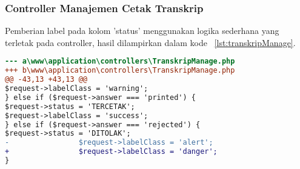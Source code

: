 \subsubsection{Controller Manajemen Cetak Transkrip}
Pemberian label pada kolom 'status' menggunakan logika sederhana yang terletak pada controller, hasil dilampirkan dalam kode ~\ref{lst:transkripManage}.
\begin{lstlisting}[language=diff, caption=Controller Manajemen Cetak Transkrip,  basicstyle=\ttfamily, frame=single,
columns=fullflexible, keepspaces=true, breaklines=true, label={lst:transkripManage}]
--- a\www\application\controllers\TranskripManage.php
+++ b\www\application\controllers\TranskripManage.php
@@ -43,13 +43,13 @@
$request->labelClass = 'warning';
} else if ($request->answer === 'printed') {
$request->status = 'TERCETAK';
$request->labelClass = 'success';
} else if ($request->answer === 'rejected') {
$request->status = 'DITOLAK';
-                $request->labelClass = 'alert';
+                $request->labelClass = 'danger';
}
\end{lstlisting}

